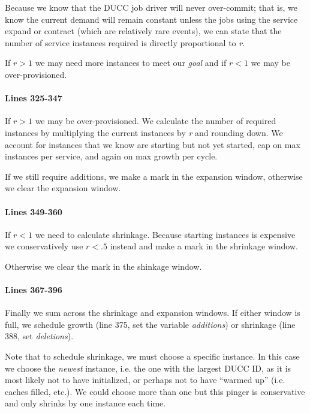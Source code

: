    Because we know that the DUCC job driver will never over-commit; that is,
   we know the current demand will remain constant unless the jobs using the
   service expand or contract (which are relatively rare events), we can state
   that the number of service instances required is directly proportional
   to {\em r}.  

   If  $r > 1$ we may need more instances to meet our {\em goal} and if
   $r < 1$ we may be over-provisioned.

   \paragraph{Lines 325-347}
   If  $r > 1$ we may be over-provisioned.  We calculate the number of required
   instances by multiplying the current instances by {\em r} and rounding down.
   We account for instances that we know are starting but not yet started,
   cap on max instances per service, and again on max growth per cycle.

   If we still require additions, we make a mark in the expansion window, 
   otherwise we clear the expansion window.

   \paragraph{Lines 349-360}
   If $r < 1$ we need to calculate shrinkage.  Because starting instances
   is expensive we conservatively use $r < .5$ instead and make a mark
   in the shrinkage window.  

   Otherwise we clear the mark in the shinkage window.

   \paragraph{Lines 367-396}
   Finally we sum across the shrinkage and expansion windows.  If either
   window is full, we schedule growth (line 375, set the variable {\em additions})
   or shrinkage (line 388, set {\em deletions}).

   Note that to schedule shrinkage, we must choose a specific instance.  In this
   case we choose the {\em newest} instance, i.e. the one with the largest
   DUCC ID, as it is most likely not to have initialized, or perhaps not to
   have ``warmed up'' (i.e. caches filled, etc.).  We could choose more than
   one but this pinger is conservative and only shrinks by one instance
   each time.

